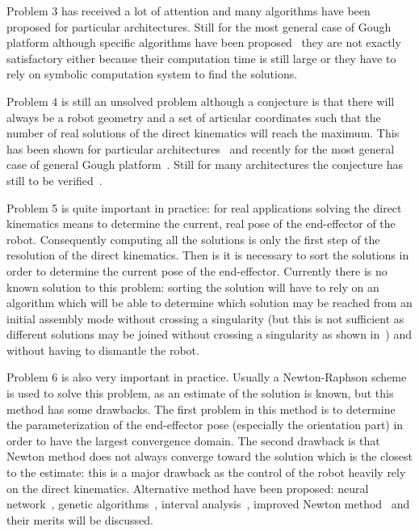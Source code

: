 Problem 3 has received a lot of attention and many algorithms have
been proposed for particular architectures. Still for the most general
case of Gough platform although specific algorithms have been
proposed~\cite{husty94-1} they are not exactly satisfactory either
because their computation time is still large or they have to rely on
symbolic computation system to find the solutions.

Problem 4 is still an unsolved problem although a conjecture is that
there will always be a robot geometry and a set of articular
coordinates such that the number of real solutions of the direct kinematics
will reach the maximum. This has been shown for particular
architectures~\cite{lazard94,merlet89-1} and recently for the most
general case of general Gough platform~\cite{dietmaier98}. Still for
many architectures the conjecture has still to be
verified~\cite{faugere95}.

Problem 5 is quite important in practice: for real applications
solving the direct kinematics means to determine the current, real
pose of the end-effector of the robot. Consequently computing all the
solutions is only the first step of the resolution of the direct
kinematics. Then is it is necessary to sort the solutions in order to
determine the current pose of the end-effector. Currently there is no
known solution to this problem: sorting the solution will have to rely
on an algorithm which will be able to determine which solution may be
reached from an initial assembly mode without crossing a singularity
(but this is not sufficient as different solutions may be joined
without crossing a singularity as shown
in~\cite{innocenti92-3,hunt98}) and without having to dismantle the
robot.

Problem 6 is also very important in practice. Usually a Newton-Raphson
scheme~\cite{reboulet85}
 is used to solve this problem, as an estimate of the
solution is known, but this method has some drawbacks. The first
problem in this
method is to determine the parameterization of the end-effector pose
(especially the orientation part) in order to have the largest
convergence domain. The second drawback is that Newton method does not
always converge toward the solution which is the closest to the
estimate: this is a major drawback as the control of the robot heavily
rely on the direct kinematics. Alternative method have been proposed:
neural network~\cite{geng91,yee91}, genetic
algorithms~\cite{boudreau96}, interval analysis~\cite{didrit98},
improved
Newton method~\cite{chetelat97} and
their merits will be discussed.

